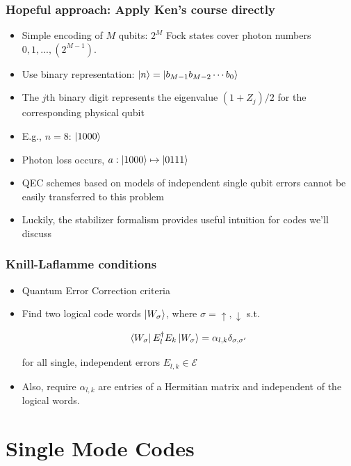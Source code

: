 \documentclass{beamer}
\newcommand\0{\mathbf{0}}
\begin{document}
\begin{frame}
\frametitle{Hopeful approach: Apply Ken's course directly}	
\begin{itemize}
\item Simple encoding of $M$ qubits: $2^M$ Fock states cover photon numbers $0, 1, . . . , (2^{M - 1})$.
\item Use binary representation: $\ket{n} = \ket{b_{M-1} b_{M-2} \cdots b_0 }$
\item The $j$th binary digit represents the eigenvalue $(1 + Z_j)/2$ for the corresponding physical qubit 
\item E.g., $n=8$: $\ket{1000}$
\pause
\item Photon loss occurs, $a : \ket{1000} \mapsto \ket{0111}$
\item QEC schemes based on models of independent single qubit errors cannot be easily transferred to this problem
\item Luckily, the stabilizer formalism provides useful intuition for codes we'll discuss
\end{itemize}
\end{frame}

\begin{frame}
\frametitle{Knill-Laflamme conditions}
\begin{itemize}
\item Quantum Error Correction criteria
\item Find two logical code words $\ket{W_\sigma}$, where $\sigma = \uparrow, \downarrow$ s.t. 

$$\bra{W_\sigma} E_l^\dag E_k \ket{W_\sigma} = \alpha_{l, k} \delta_{\sigma, \sigma'}$$

 for all single, independent errors $E_{l,k} \in \mathcal{E}$
 \item Also, require $\alpha_{l,k}$ are entries of a Hermitian matrix and independent of the logical words.	
\end{itemize}
\end{frame}


\section{Single Mode Codes}
\end{document}

